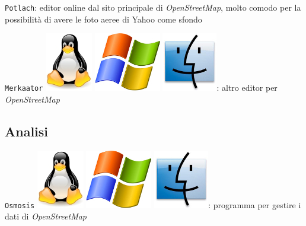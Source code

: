 \documentclass[a4paper,twoside,12pt,]{article}
\newcommand{\osm}{\emph{OpenStreetMap}\xspace}
\newcommand{\soft}[1]{\texttt{#1}}
\begin{document}
\soft{Potlach}: editor online dal sito principale di \osm, molto comodo per la possibilità di avere le foto aeree di Yahoo come sfondo

\soft{Merkaator} \includegraphics{./linux-logo.jpg} \includegraphics{./windows-logo.jpg} \includegraphics{./mac-logo.jpg}: altro editor per \osm 

\subsection{Analisi}
\soft{Osmosis} \includegraphics{./linux-logo.jpg} \includegraphics{./windows-logo.jpg} \includegraphics{./mac-logo.jpg}: programma per gestire i dati di \osm
\end{document}
